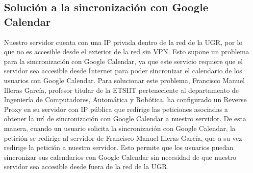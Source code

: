 \subsection{Solución a la sincronización con Google Calendar}

Nuestro servidor cuenta con una IP privada dentro de la red de la UGR, por lo que no es accesible desde el exterior de la red sin VPN. Esto supone un problema para la sincronización con Google Calendar, ya que este servicio requiere que el servidor sea accesible desde Internet para poder sincronizar el calendario de los usuarios con Google Calendar.
\newline\newline
Para solucionar este problema, Francisco Manuel Illeras García, profesor titular de la ETSIIT perteneciente al departamento de Ingeniería de Computadores, Automática y Robótica, ha configurado un Reverse Proxy en su servidor con IP pública que redirige las peticiones asociadas a obtener la url de sincronización con Google Calendar a nuestro servidor. De esta manera, cuando un usuario solicita la sincronización con Google Calendar, la petición se redirige al servidor de Francisco Manuel Illeras García, que a su vez redirige la petición a nuestro servidor. Esto permite que los usuarios puedan sincronizar sus calendarios con Google Calendar sin necesidad de que nuestro servidor sea accesible desde fuera de la red de la UGR.